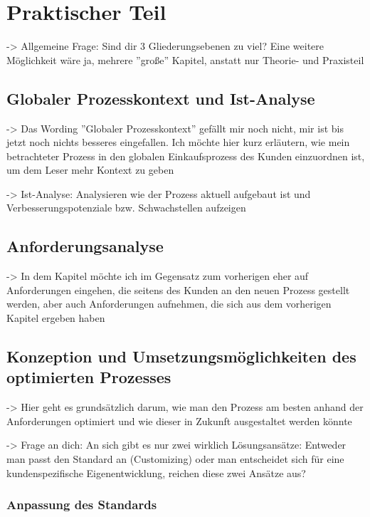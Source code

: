 \chapter{Praktischer Teil}

-> Allgemeine Frage: Sind dir 3 Gliederungsebenen zu viel? Eine weitere Möglichkeit wäre ja, mehrere ''große'' Kapitel, anstatt nur Theorie- und Praxisteil

\section{Globaler Prozesskontext und Ist-Analyse}

-> Das Wording ''Globaler Prozesskontext'' gefällt mir noch nicht, mir ist bis jetzt noch nichts besseres eingefallen. Ich möchte hier kurz erläutern, wie mein betrachteter Prozess in den globalen Einkaufsprozess des Kunden einzuordnen ist, um dem Leser mehr Kontext zu geben

-> Ist-Analyse: Analysieren wie der Prozess aktuell aufgebaut ist und Verbesserungspotenziale bzw. Schwachstellen aufzeigen

\section{Anforderungsanalyse}

-> In dem Kapitel möchte ich im Gegensatz zum vorherigen eher auf Anforderungen eingehen, die seitens des Kunden an den neuen Prozess gestellt werden, aber auch Anforderungen aufnehmen, die sich aus dem vorherigen Kapitel ergeben haben

\section{Konzeption und Umsetzungsmöglichkeiten des optimierten Prozesses}

-> Hier geht es grundsätzlich darum, wie man den Prozess am besten anhand der Anforderungen optimiert und wie dieser in Zukunft ausgestaltet werden könnte 

-> Frage an dich: An sich gibt es nur zwei wirklich Lösungsansätze: Entweder man passt den Standard an (Customizing) oder man entscheidet sich für eine kundenspezifische Eigenentwicklung, reichen diese zwei Ansätze aus?

\subsection{Anpassung des Standards}

